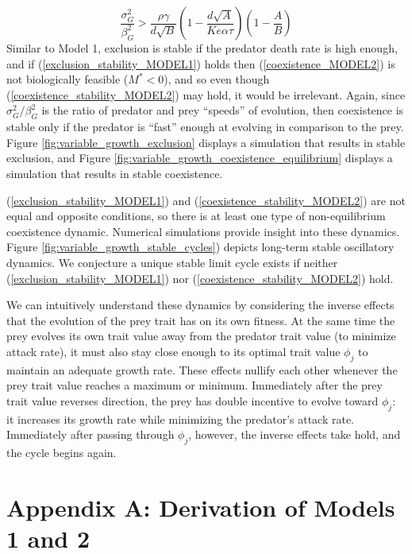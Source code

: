 \documentclass{amsart}
\theoremstyle{definition}
\theoremstyle{remark}
\numberwithin{equation}{section}
\begin{document}
\begin{equation}
	\label{coexistence_stability_MODEL2}
	\frac{\sigma_G^2}{\beta_G^2} > \frac{\rho\gamma}{d\sqrt{B}}\left(1 - \frac{d\sqrt{A}}{Ke\alpha\tau}\right)\left(1 - \frac{A}{B}\right)
\end{equation}
Similar to Model 1, exclusion is stable if the predator death rate is high enough, and if (\ref{exclusion_stability_MODEL1}) holds then (\ref{coexistence_MODEL2}) is not biologically feasible ($M^* < 0$), and so even though (\ref{coexistence_stability_MODEL2}) may hold, it would be irrelevant.  Again, since $\sigma_G^2/\beta_G^2$ is the ratio of predator and prey ``speeds'' of evolution, then coexistence is stable only if the predator is ``fast'' enough at evolving in comparison to the prey.  Figure \ref{fig:variable_growth_exclusion} displays a simulation that results in stable exclusion, and Figure \ref{fig:variable_growth_coexistence_equilibrium} displays a simulation that results in stable coexistence.

(\ref{exclusion_stability_MODEL1}) and (\ref{coexistence_stability_MODEL2}) are not equal and opposite conditions, so there is at least one type of non-equilibrium coexistence dynamic.  Numerical simulations provide insight into these dynamics.  Figure \ref{fig:variable_growth_stable_cycles}) depicts long-term stable oscillatory dynamics.  We conjecture a unique stable limit cycle exists if neither (\ref{exclusion_stability_MODEL1}) nor (\ref{coexistence_stability_MODEL2}) hold.

We can intuitively understand these dynamics by considering the inverse effects that the evolution of the prey trait has on its own fitness.  At the same time the prey evolves its own trait value away from the predator trait value (to minimize attack rate), it must also stay close enough to its optimal trait value $\phi_j$ to maintain an adequate growth rate.  These effects nullify each other whenever the prey trait value reaches a maximum or minimum.  Immediately after the prey trait value reverses direction, the prey has double incentive to evolve toward $\phi_j$: it increases its growth rate while minimizing the predator's attack rate.  Immediately after passing through $\phi_j$, however, the inverse effects take hold, and the cycle begins again.

\section*{Appendix A: Derivation of Models 1 and 2}
\end{document}
